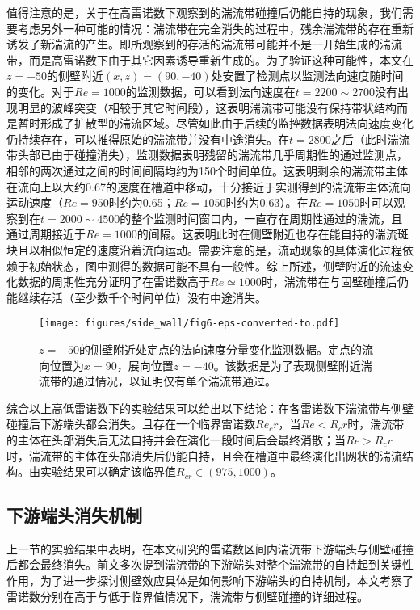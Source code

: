 值得注意的是，关于在高雷诺数下观察到的湍流带碰撞后仍能自持的现象，我们需要考虑另外一种可能的情况：湍流带在完全消失的过程中，残余湍流带的存在重新诱发了新湍流的产生。即所观察到的存活的湍流带可能并不是一开始生成的湍流带，而是高雷诺数下由于其它因素诱导重新生成的。为了验证这种可能性，本文在$z = -50$的侧壁附近$(x,z) = (90,-40)$处安置了检测点以监测法向速度随时间的变化。对于$Re=1000$的监测数据，可以看到法向速度在$t = 2200\sim2700$没有出现明显的波峰突变（相较于其它时间段），这表明湍流带可能没有保持带状结构而是暂时形成了扩散型的湍流区域。尽管如此由于后续的监控数据表明法向速度变化仍持续存在，可以推得原始的湍流带并没有中途消失。在$t = 2800$之后（此时湍流带头部已由于碰撞消失），监测数据表明残留的湍流带几乎周期性的通过监测点，相邻的两次通过之间的时间间隔均约为150个时间单位。这表明剩余的湍流带主体在流向上以大约0.67的速度在槽道中移动，十分接近于\cite{Xiao2020b}实测得到的湍流带主体流向运动速度（$Re = 950$时约为0.65；$Re = 1050$时约为0.63）。在$Re = 1050$时可以观察到在$t = 2000\sim4500$的整个监测时间窗口内，一直存在周期性通过的湍流，且通过周期接近于$Re = 1000$的间隔。这表明此时在侧壁附近也存在能自持的湍流斑块且以相似恒定的速度沿着流向运动。需要注意的是，流动现象的具体演化过程依赖于初始状态，图中测得的数据可能不具有一般性。综上所述，侧壁附近的流速变化数据的周期性充分证明了在雷诺数高于$Re\simeq 1000$时，湍流带在与固壁碰撞后仍能继续存活（至少数千个时间单位）没有中途消失。

\begin{figure}[htb]
\centering
\texttt{[image: figures/side\_wall/fig6-eps-converted-to.pdf]}
\caption{\label{fig:monitor_point}  $z=-50$的侧壁附近处定点的法向速度分量变化监测数据。定点的流向位置为$x=90$，展向位置$z=-40$。该数据是为了表现侧壁附近湍流带的通过情况，以证明仅有单个湍流带通过。}
\end{figure}

综合以上高低雷诺数下的实验结果可以给出以下结论：在各雷诺数下湍流带与侧壁碰撞后下游端头都会消失。且存在一个临界雷诺数$Re_cr$，当$Re < R_cr$时，湍流带的主体在头部消失后无法自持并会在演化一段时间后会最终消散；当$Re > R_cr$时，湍流带的主体在头部消失后仍能自持，且会在槽道中最终演化出网状的湍流结构。由实验结果可以确定该临界值$R_{cr} \in (975,1000)$。

\subsection{下游端头消失机制}
上一节的实验结果中表明，在本文研究的雷诺数区间内湍流带下游端头与侧壁碰撞后都会最终消失。前文多次提到湍流带的下游端头对整个湍流带的自持起到关键性作用，为了进一步探讨侧壁效应具体是如何影响下游端头的自持机制，本文考察了雷诺数分别在高于与低于临界值情况下，湍流带与侧壁碰撞的详细过程。

